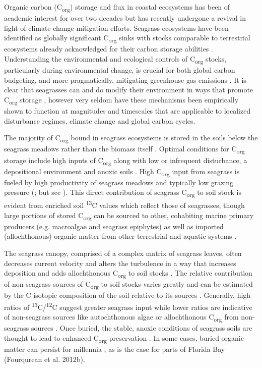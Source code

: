 Organic carbon (C\textsubscript{org}) storage and flux in coastal ecosystems has been of academic interest for over two decades \citep{Smith:1981dk} but has recently undergone a revival in light of climate change mitigation efforts. Seagrass ecosystems have been identified as globally significant C\textsubscript{org} sinks \citep{Duarte:2005va, Mcleod:2011gs} with stocks comparable to terrestrial ecosystems already acknowledged for their carbon storage abilities \citep{Fourqurean:2012cv}. Understanding the environmental and ecological controls of C\textsubscript{org} stocks, particularly during environmental change, is crucial for both global carbon budgeting, and more pragmatically, mitigating greenhouse gas emissions \citep{Macreadie:2014fz}. It is clear that seagrasses can and do modify their environment in ways that promote C\textsubscript{org} storage \citep{Mateo:2006wk, Duarte:2011da}, however very seldom have these mechanisms been empirically shown to function at magnitudes and timescales that are applicable to localized disturbance regimes, climate change and global carbon cycles.

The majority of C\textsubscript{org} bound in seagrass ecosystems is stored in the soils below the seagrass meadows rather than the biomass itself \citep{Fourqurean:2012cv}. Optimal conditions for C\textsubscript{org} storage include high inputs of C\textsubscript{org} along with low or infrequent disturbance, a depositional environment and anoxic soils \citep{Duarte:2011da, Fourqurean:2012cv}. High C\textsubscript{org} input from seagrass is fueled by high productivity of seagrass meadows and typically low grazing pressure (\citealt{Westlake:1963ts, Zieman:1980wp, Enriquez:1993ul, Duarte:1996wm}; but see \citealt{HeckJr:2006km}). This direct contribution of seagrass C\textsubscript{org} to soil stock is evident from enriched soil \textsuperscript{13}C values which reflect those of seagrasses, though large portions of stored C\textsubscript{org} can be sourced to other, cohabiting marine primary producers (e.g. macroalgae and seagrass epiphytes) as well as imported (allochthonous) organic matter from other terrestrial and aquatic systems \citep{Kennedy:2010if}.

The seagrass canopy, comprised of a complex matrix of seagrass leaves, often decreases current velocity and alters the turbulence in a way that increases deposition and adds allochthonous C\textsubscript{org} to soil stocks \citep{Ward:1984vm, Fonseca:1986tz, Hendriks:2008ew}. The relative contribution of non-seagrass sources of C\textsubscript{org} to soil stocks varies greatly and can be estimated by the C isotopic composition of the soil relative to its sources \citep{Kennedy:2010if}. Generally, high ratios of \textsuperscript{13}C/\textsuperscript{12}C suggest greater seagrass input while lower ratios are indicative of non-seagrass sources like autochthonous algae or allochthonous C\textsubscript{org} from non-seagrass sources \citep{Gacia:2002tt}. Once buried, the stable, anoxic conditions of seagrass soils are thought to lead to enhanced C\textsubscript{org} preservation \citep{Duarte:2011da}. In some cases, buried organic matter can persist for millennia \citep{Mateo:1997uw, LopezSaez:2009ed}, as is the case for parts of Florida Bay (Fourqurean et al. 2012b).

